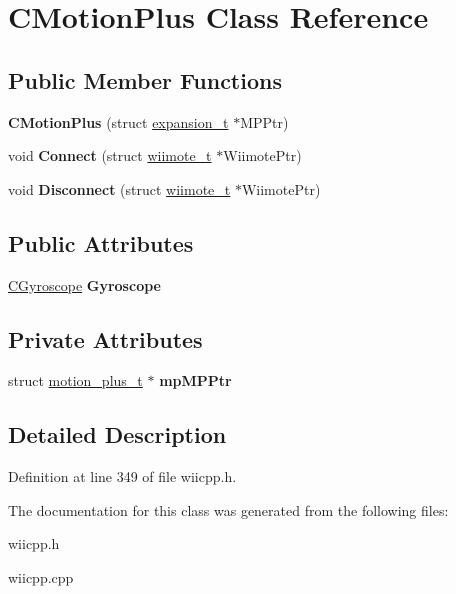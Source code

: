 \hypertarget{class_c_motion_plus}{\section{C\-Motion\-Plus Class Reference}
\label{class_c_motion_plus}
}
\subsection*{Public Member Functions}
\begin{DoxyCompactItemize}
\item 
\hypertarget{class_c_motion_plus_a6a7d7e2765c93610e2d62f343d254259}{{\bfseries C\-Motion\-Plus} (struct \hyperlink{structexpansion__t}{expansion\-\_\-t} $\ast$M\-P\-Ptr)}\label{class_c_motion_plus_a6a7d7e2765c93610e2d62f343d254259}

\item 
\hypertarget{class_c_motion_plus_a6f1816446589b1daa218eb04bd3aa9e2}{void {\bfseries Connect} (struct \hyperlink{structwiimote__t}{wiimote\-\_\-t} $\ast$Wiimote\-Ptr)}\label{class_c_motion_plus_a6f1816446589b1daa218eb04bd3aa9e2}

\item 
\hypertarget{class_c_motion_plus_a550b257a0dd6214094caf705a6cf5ee7}{void {\bfseries Disconnect} (struct \hyperlink{structwiimote__t}{wiimote\-\_\-t} $\ast$Wiimote\-Ptr)}\label{class_c_motion_plus_a550b257a0dd6214094caf705a6cf5ee7}

\end{DoxyCompactItemize}
\subsection*{Public Attributes}
\begin{DoxyCompactItemize}
\item 
\hypertarget{class_c_motion_plus_af0b450efc55f0f6808d1e67746f9542f}{\hyperlink{class_c_gyroscope}{C\-Gyroscope} {\bfseries Gyroscope}}\label{class_c_motion_plus_af0b450efc55f0f6808d1e67746f9542f}

\end{DoxyCompactItemize}
\subsection*{Private Attributes}
\begin{DoxyCompactItemize}
\item 
\hypertarget{class_c_motion_plus_ace56fafafa2b5105da94884e261c4a9c}{struct \hyperlink{structmotion__plus__t}{motion\-\_\-plus\-\_\-t} $\ast$ {\bfseries mp\-M\-P\-Ptr}}\label{class_c_motion_plus_ace56fafafa2b5105da94884e261c4a9c}

\end{DoxyCompactItemize}


\subsection{Detailed Description}


Definition at line 349 of file wiicpp.\-h.



The documentation for this class was generated from the following files\-:\begin{DoxyCompactItemize}
\item 
wiicpp.\-h\item 
wiicpp.\-cpp\end{DoxyCompactItemize}
